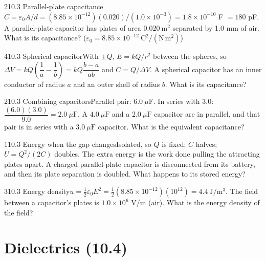 \documentclass[11pt]{article}
\begin{document}
\begin{q}{2}{10.3 Parallel-plate capacitance}{$C = \varepsilon_0A/d = (8.85\times10^{-12})(0.020)/(1.0\times10^{-3}) = 1.8\times10^{-10}$ F $= 180$ pF.}
A parallel-plate capacitor has plates of area $0.020\ \mathrm{m^2}$ separated by 1.0 mm of air. What is its capacitance? ($\varepsilon_0 = 8.85\times10^{-12}\ \mathrm{C^2/(N\,m^2)}$)
\end{q}
\begin{q}{4}{10.3 Spherical capacitor}{With $\pm Q$, $E = kQ/r^2$ between the spheres, so $\Delta V = kQ\left(\dfrac1a - \dfrac1b\right) = kQ\dfrac{b - a}{ab}$ and $C = Q/\Delta V$.}
A spherical capacitor has an inner conductor of radius $a$ and an outer shell of radius $b$. What is its capacitance?
\end{q}
\begin{q}{2}{10.3 Combining capacitors}{Parallel pair: $6.0\ \mu\mathrm{F}$. In series with 3.0: $\dfrac{(6.0)(3.0)}{9.0} = 2.0\ \mu\mathrm{F}$.}
A $4.0\ \mu\mathrm{F}$ and a $2.0\ \mu\mathrm{F}$ capacitor are in parallel, and that pair is in series with a $3.0\ \mu\mathrm{F}$ capacitor. What is the equivalent capacitance?
\end{q}
\begin{q}{1}{10.3 Energy when the gap changes}{Isolated, so $Q$ is fixed; $C$ halves; $U = Q^2/(2C)$ doubles. The extra energy is the work done pulling the attracting plates apart.}
A charged parallel-plate capacitor is disconnected from its battery, and then its plate separation is doubled. What happens to its stored energy?
\end{q}
\begin{q}{3}{10.3 Energy density}{$u = \tfrac12\varepsilon_0E^2 = \tfrac12(8.85\times10^{-12})(10^{12}) = 4.4\ \mathrm{J/m^3}$.}
The field between a capacitor's plates is $1.0\times10^6$ V/m (air). What is the energy density of the field?
\end{q}

\section{Dielectrics (10.4)}
\end{document}
